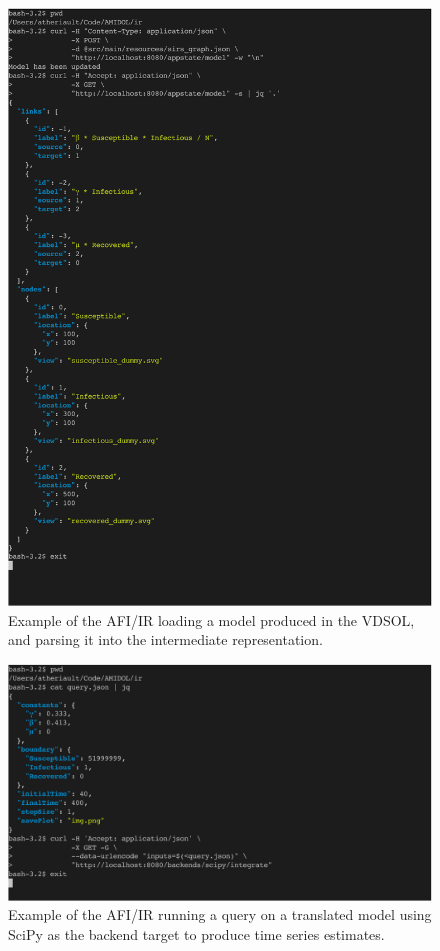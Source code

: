 \documentclass[11pt]{article}
\begin{document}
\begin{figure}
\includegraphics[width=\textwidth]{figs/LoadModel-crop.pdf}
\caption{Example of the AFI/IR loading a model produced in the VDSOL, and parsing it into the intermediate representation.}
\label{Fig:LoadModel}
\end{figure}

\begin{figure}
\includegraphics[width=\textwidth]{figs/QueryIntegrateBackend-crop.pdf}
\caption{Example of the AFI/IR running a query on a translated model using SciPy as the backend target to produce time series estimates.}
\label{Fig:Query}
\end{figure}
\end{document}
